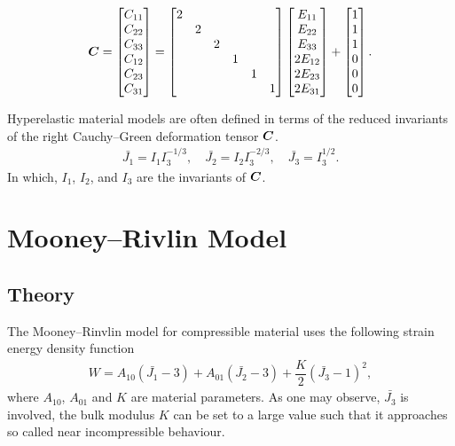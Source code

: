 \begin{gather}
    \bm{C}=\begin{bmatrix}
        C_{11} \\
        C_{22} \\
        C_{33} \\
        C_{12} \\
        C_{23} \\
        C_{31}
    \end{bmatrix}=\begin{bmatrix}
        2 &   &   &   &   &   \\
          & 2 &   &   &   &   \\
          &   & 2 &   &   &   \\
          &   &   & 1 &   &   \\
          &   &   &   & 1 &   \\
          &   &   &   &   & 1 \\
    \end{bmatrix}\begin{bmatrix}
        E_{11}  \\
        E_{22}  \\
        E_{33}  \\
        2E_{12} \\
        2E_{23} \\
        2E_{31}
    \end{bmatrix}+\begin{bmatrix}
        1 \\1\\1\\0\\0\\0
    \end{bmatrix}.
\end{gather}

Hyperelastic material models are often defined in terms of the reduced invariants of the right Cauchy--Green deformation tensor $\bm{C}$.
\begin{gather}
\bar{J_1}=I_1I_3^{-1/3},\quad
\bar{J_2}=I_2I_3^{-2/3},\quad
\bar{J_3}=I_3^{1/2}.
\end{gather}
In which, $I_1$, $I_2$, and $I_3$ are the invariants of $\bm{C}$.
\section{Mooney--Rivlin Model}
\subsection{Theory}
The Mooney--Rinvlin model for compressible material uses the following strain energy density function
\begin{gather}
W=A_{10}\left(\bar{J_1}-3\right)+A_{01}\left(\bar{J_2}-3\right)+\dfrac{K}{2}\left(\bar{J_3}-1\right)^2,
\end{gather}
where $A_{10}$, $A_{01}$ and $K$ are material parameters.
As one may observe, $\bar{J_3}$ is involved, the bulk modulus $K$ can be set to a large value such that it approaches so called near incompressible behaviour.

